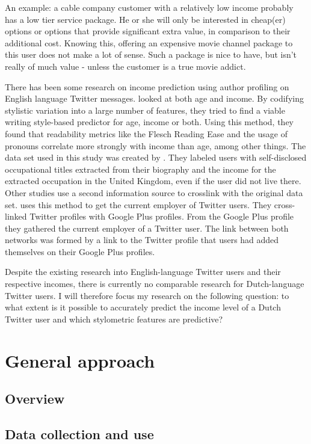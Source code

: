 \documentclass[11pt, a4paper]{article}
\begin{document}
An example: a cable company customer with a relatively low income probably has a low tier service package. He or she will only be interested in cheap(er) options or options that provide significant extra value, in comparison to their additional cost. Knowing this, offering an expensive movie channel package to this user does not make a lot of sense. Such a package is nice to have, but isn't really of much value - unless the customer is a true movie addict.

There has been some research on income prediction using author profiling on English language Twitter messages. \citet{flekova} looked at both age and income. By codifying stylistic variation into a large number of features, they tried to find a viable writing style-based predictor for age, income or both. Using this method, they found that readability metrics like the Flesch Reading Ease and the usage of pronouns correlate more strongly with income than age, among other things. The data set used in this study was created by \citet{pietro}. They labeled users with self-disclosed occupational titles extracted from their biography and the income for the extracted occupation in the United Kingdom, even if the user did not live there. Other studies use a second information source to crosslink with the original data set.  \citet{li} uses this method to get the current employer of Twitter users. They cross-linked Twitter profiles with Google Plus profiles. From the Google Plus profile they gathered the current employer of a Twitter user. The link between both networks was formed by a link to the Twitter profile that users had added themselves on their Google Plus profiles.

Despite the existing research into English-language Twitter users and their respective incomes, there is currently no comparable research for Dutch-language Twitter users. I will therefore focus my research on the following question: to what extent is it possible to accurately predict the income level of a Dutch Twitter user and which stylometric features are predictive?

\section{General approach}
\subsection{Overview}

\subsection{Data collection and use}
\end{document}
